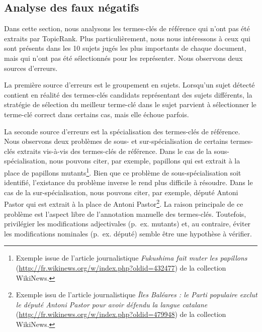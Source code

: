   \subsection{Analyse des faux négatifs}
  \label{subsec:analyse_faux_négatifs}
    Dans cette section, nous analysons les termes-clés de référence qui n'ont
    pas été extraits par TopicRank. Plus particulièrement, nous nous intéressons
    à ceux qui sont présents dans les 10 sujets jugés les plus importants de
    chaque document, mais qui n'ont pas été sélectionnés pour les représenter.
    Nous observons deux sources d'erreurs.

    La première source d'erreurs est le groupement en sujets. Lorsqu'un sujet
    détecté contient en réalité des termes-clés candidats représentant des
    sujets différents, la stratégie de sélection du meilleur terme-clé dans le
    sujet parvient à sélectionner le terme-clé correct dans certains cas, mais
    elle échoue parfois.

    La seconde source d'erreurs est la spécialisation des termes-clés de
    référence. Nous observons deux problèmes de sous- et sur-spécialisation de
    certains termes-clés extraits vis-à-vis des termes-clés de référence. Dans
    le cas de la sous-spécialisation, nous pouvons citer, par exemple,
    \og{}papillons\fg{} qui est extrait à la place de \og{}papillons
    mutants\fg{}\footnote{Exemple issue de l'article journalistique
    \textit{Fukushima fait muter les papillons}
    (\url{http://fr.wikinews.org/w/index.php?oldid=432477}) de la collection
    WikiNews.}. Bien que ce problème de sous-spécialisation soit identifié,
    l'existance du problème inverse le rend plus difficile à résoudre. Dans le
    cas de la sur-spécialisation, nous pouvons citer, par exemple, \og{}député
    Antoni Pastor\fg{} qui est extrait à la place de \og{}Antoni
    Pastor\fg{}\footnote{Exemple issu de l'article journalistique \textit{Îles
    Baléares : le Parti populaire exclut le député Antoni Pastor pour avoir
    défendu la langue catalane}
    (\url{http://fr.wikinews.org/w/index.php?oldid=479948}) de la collection
    WikiNews.}. La raison principale de ce problème est l'aspect libre de
    l'annotation manuelle des termes-clés. Toutefois, privilégier les
    modifications adjectivales (p.~ex. \og{}mutants\fg{}) et, au contraire,
    éviter les modifications nominales (p.~ex. \og{}député\fg{}) semble être une
    hypothèse à vérifier.

